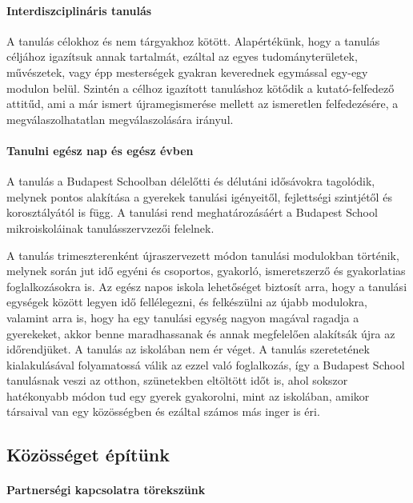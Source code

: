 \paragraph{Interdiszciplináris tanulás}

A tanulás célokhoz és nem tárgyakhoz kötött. Alapértékünk, hogy a tanulás
céljához igazítsuk annak tartalmát, ezáltal az egyes tudományterületek,
művészetek, vagy épp mesterségek gyakran keverednek egymással egy-egy modulon
belül. Szintén a célhoz igazított tanuláshoz kötődik a kutató-felfedező
attitűd, ami a már ismert újramegismerése mellett az ismeretlen
felfedezésére,
a megválaszolhatatlan megválaszolására irányul.

\paragraph{Tanulni egész nap és egész évben}

A tanulás a Budapest Schoolban délelőtti és délutáni idősávokra tagolódik,
melynek pontos
alakítása a gyerekek tanulási igényeitől, fejlettségi szintjétől és
korosztályától is függ. A tanulási rend meghatározásáért a Budapest
School mikroiskoláinak tanulásszervzezői felelnek.

A tanulás trimeszterenként újraszervezett módon tanulási
modulokban történik, melynek során jut idő egyéni és csoportos,
gyakorló, ismeretszerző és gyakorlatias foglalkozásokra is. Az egész
napos iskola lehetőséget biztosít arra, hogy a tanulási egységek között
legyen idő fellélegezni, és felkészülni az újabb modulokra, valamint
arra is, hogy ha egy tanulási egység nagyon magával ragadja a
gyerekeket, akkor benne maradhassanak és annak megfelelően alakítsák
újra az időrendjüket. A tanulás az iskolában nem ér véget. A tanulás
szeretetének kialakulásával folyamatossá válik az ezzel való foglalkozás, így a
Budapest School tanulásnak veszi az otthon, szünetekben eltöltött időt is, ahol
sokszor hatékonyabb módon tud egy gyerek gyakorolni, mint az iskolában, amikor
társaival van egy közösségben és ezáltal számos más inger is éri.

\subsection{Közösséget építünk}
\label{sec:kozosseget_epitunk}
\paragraph{Partnerségi kapcsolatra törekszünk}

